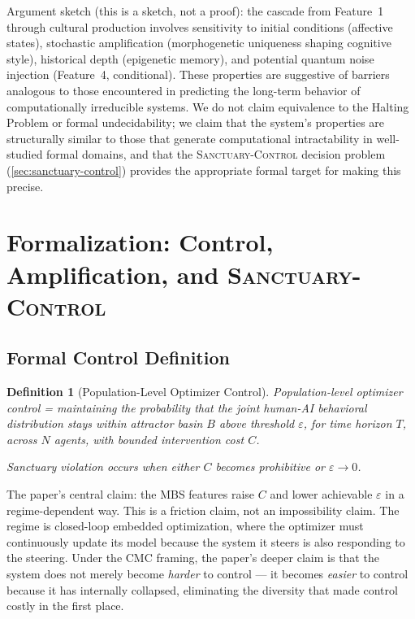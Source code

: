 \documentclass[11pt, a4paper]{article}
\newtheorem{definition}{Definition}[section]
\theoremstyle{remark}
\newcommand{\SC}{\textsc{Sanctuary-Control}}
\begin{document}
Argument sketch (this is a sketch, not a proof): the cascade from Feature~1 through cultural production involves sensitivity to initial conditions (affective states), stochastic amplification (morphogenetic uniqueness shaping cognitive style), historical depth (epigenetic memory), and potential quantum noise injection (Feature~4, conditional). These properties are suggestive of barriers analogous to those encountered in predicting the long-term behavior of computationally irreducible systems. We do not claim equivalence to the Halting Problem or formal undecidability; we claim that the system's properties are structurally similar to those that generate computational intractability in well-studied formal domains, and that the \SC{} decision problem (\cref{sec:sanctuary-control}) provides the appropriate formal target for making this precise.

\section{Formalization: Control, Amplification, and \texorpdfstring{\textsc{Sanctuary-Control}}{Sanctuary-Control}}\label{sec:formalization}

\subsection{Formal Control Definition}\label{sec:control-def}

\begin{definition}[Population-Level Optimizer Control]
Population-level optimizer control = maintaining the probability that the joint human-AI behavioral distribution stays within attractor basin $B$ above threshold $\varepsilon$, for time horizon $T$, across $N$ agents, with bounded intervention cost $C$.

Sanctuary violation occurs when either $C$ becomes prohibitive or $\varepsilon \to 0$.
\end{definition}

The paper's central claim: the MBS features raise $C$ and lower achievable $\varepsilon$ in a regime-dependent way. This is a friction claim, not an impossibility claim. The regime is closed-loop embedded optimization, where the optimizer must continuously update its model because the system it steers is also responding to the steering. Under the CMC framing, the paper's deeper claim is that the system does not merely become \emph{harder} to control --- it becomes \emph{easier} to control because it has internally collapsed, eliminating the diversity that made control costly in the first place.
\end{document}
